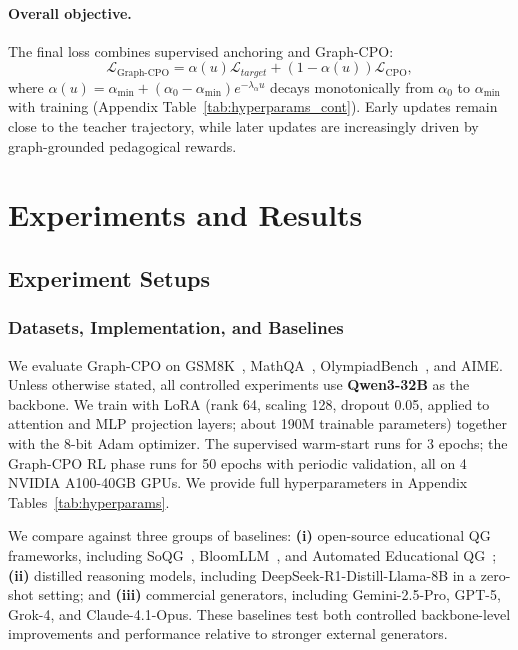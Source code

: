 \documentclass[sigconf, anonymous, review, screen]{acmart}
\begin{document}
\paragraph{Overall objective.}
The final loss combines supervised anchoring and Graph-CPO:
\begin{equation}
\mathcal{L}_{\mathrm{Graph\mbox{-}CPO}}
=
\alpha(u)\mathcal{L}_{target}
+
(1-\alpha(u))\mathcal{L}_{\mathrm{CPO}},
\label{eq:total_loss}
\end{equation}
where $\alpha(u)=\alpha_{\min}+(\alpha_0-\alpha_{\min})e^{-\lambda_\alpha u}$ decays monotonically from $\alpha_0$ to $\alpha_{\min}$ with training (Appendix Table~\ref{tab:hyperparams_cont}). Early updates remain close to the teacher trajectory, while later updates are increasingly driven by graph-grounded pedagogical rewards.


\section{Experiments and Results}

\subsection{Experiment Setups}

\subsubsection{Datasets, Implementation, and Baselines}
We evaluate Graph-CPO on GSM8K~\cite{cobbe2021training}, MathQA~\cite{majumder2019mathqa}, OlympiadBench~\cite{he2024olympiadbench}, and AIME. Unless otherwise stated, all controlled experiments use \textbf{Qwen3-32B} as the backbone. We train with LoRA (rank 64, scaling 128, dropout 0.05, applied to attention and MLP projection layers; about 190M trainable parameters) together with the 8-bit Adam optimizer. The supervised warm-start runs for 3 epochs; the Graph-CPO RL phase runs for 50 epochs with periodic validation, all on 4 NVIDIA A100-40GB GPUs. We provide full hyperparameters in Appendix Tables~\ref{tab:hyperparams}.


We compare against three groups of baselines: \textbf{(i)} open-source educational QG frameworks, including SoQG~\cite{ang2023socratic}, BloomLLM~\cite{duong2024bloomllm}, and Automated Educational QG~\cite{scaria2024automated}; \textbf{(ii)} distilled reasoning models, including DeepSeek-R1-Distill-Llama-8B in a zero-shot setting; and \textbf{(iii)} commercial generators, including Gemini-2.5-Pro, GPT-5, Grok-4, and Claude-4.1-Opus. These baselines test both controlled backbone-level improvements and performance relative to stronger external generators.
\end{document}
